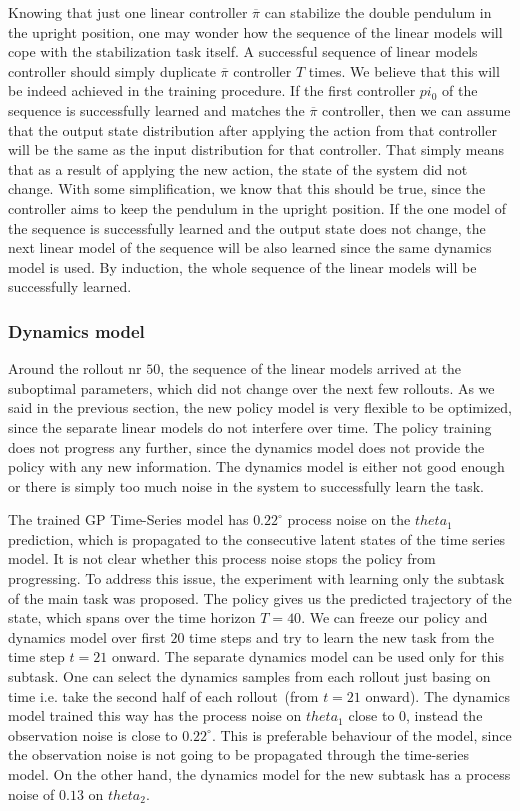 \noindent Knowing that just one linear controller $\overline{\pi}$ can stabilize the double pendulum in the upright position, one may wonder how the sequence of the linear models will cope with the stabilization task itself. A successful sequence of linear models controller should simply duplicate $\overline{\pi}$ controller $T$ times. We believe that this will be indeed achieved in the training procedure. If the first controller $pi_{0}$ of the sequence is successfully learned and matches the $\overline{\pi}$ controller, then we can assume that the output state distribution after applying the action from that controller will be the same as the input distribution for that controller. That simply means that as a result of applying the new action, the state of the system did not change. With some simplification, we know that this should be true, since the controller aims to keep the pendulum in the upright position. If the one model of the sequence is successfully learned and the output state does not change, the next linear model of the sequence will be also learned since the same dynamics model is used. By induction, the whole sequence of the linear models will be successfully learned.

\subsubsection{Dynamics model}
\label{s:exps:double:dyns}
Around the rollout nr $50$, the sequence of the linear models arrived at the suboptimal parameters, which did not change over the next few rollouts. As we said in the previous section, the new policy model is very flexible to be optimized, since the separate linear models do not interfere over time. The policy training does not progress any further, since the dynamics model does not provide the policy with any new information. The dynamics model is either not good enough or there is simply too much noise in the system to successfully learn the task.  

\noindent The trained GP Time-Series model has $0.22^{\circ}$ process noise on the $theta_{1}$ prediction, which is propagated to the consecutive latent states of the time series model. It is not clear whether this process noise stops the policy from progressing. To address this issue, the experiment with learning only the subtask of the main task was proposed. The policy gives us the predicted trajectory of the state, which spans over the time horizon $T=40$. We can freeze our policy and dynamics model over first $20$ time steps and try to learn the new task from the time step $t=21$ onward. The separate dynamics model can be used only for this subtask. One can select the dynamics samples from each rollout just basing on time i.e. take the second half of each rollout\ (from $t=21$ onward). The dynamics model trained this way has the process noise on $theta_{1}$ close to $0$, instead the observation noise is close to  $0.22^{\circ}$. This is preferable behaviour of the model, since the observation noise is not going to be propagated through the time-series model. On the other hand, the dynamics model for the new subtask has a process noise of $0.13$ on $theta_{2}$. 


